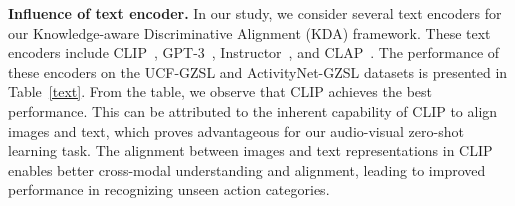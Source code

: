 \documentclass[10pt,twocolumn,letterpaper]{article}
\begin{document}
\begin{table}[t]
    \centering
    \caption{Ablation study: Influence of different $\lambda$.}
    \label{lamda}
\end{table}

\begin{table}[t]
    \centering
    \caption{Ablation study: Influence of different text encoder.}
    \label{text}
\end{table}

\noindent
\textbf{Influence of text encoder.}
In our study, we consider several text encoders for our Knowledge-aware Discriminative Alignment (KDA) framework. These text encoders include CLIP~\cite{clip}, GPT-3~\cite{yang2022empirical}, Instructor~\cite{instructor}, and CLAP~\cite{clap}. The performance of these encoders on the UCF-GZSL and ActivityNet-GZSL datasets is presented in Table~\ref{text}. From the table, we observe that CLIP achieves the best performance. This can be attributed to the inherent capability of CLIP to align images and text, which proves advantageous for our audio-visual zero-shot learning task. The alignment between images and text representations in CLIP enables better cross-modal understanding and alignment, leading to improved performance in recognizing unseen action categories.
\end{document}
